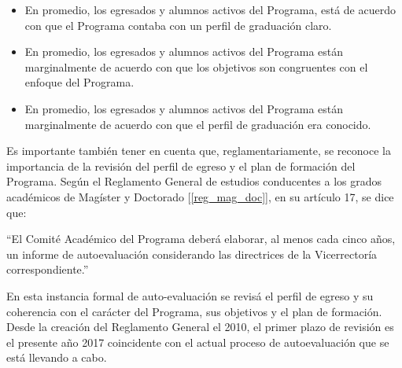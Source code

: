 \begin{itemize}
\item En promedio, los egresados y alumnos activos del Programa, está 
de acuerdo con que el Programa contaba con un perfil de graduación claro.
\item En promedio, los egresados y alumnos activos del Programa están marginalmente de acuerdo con que 
los objetivos son congruentes con el enfoque del Programa.
\item En promedio, los egresados y alumnos activos del Programa están marginalmente 
de acuerdo con que el perfil de graduación era conocido.
\end{itemize}


Es importante también tener en cuenta que, reglamentariamente, se reconoce la importancia de
la revisión del perfil de egreso y el plan de formación del Programa. Según el Reglamento General
de estudios conducentes a los grados académicos de Magíster y Doctorado [\ref{reg_mag_doc}], en su artículo 17,
se dice que:

``El Comité Académico del Programa deberá elaborar, al menos cada cinco años, un informe
de autoevaluación considerando las directrices de la Vicerrectoría correspondiente.''

En esta instancia formal de auto-evaluación se revisá el perfil de egreso y su coherencia con
el carácter del Programa, sus objetivos y el plan de formación. Desde la creación del Reglamento
General el 2010, el primer plazo de revisión es el presente año 2017 coincidente con el actual
proceso de autoevaluación que se está llevando a cabo.

